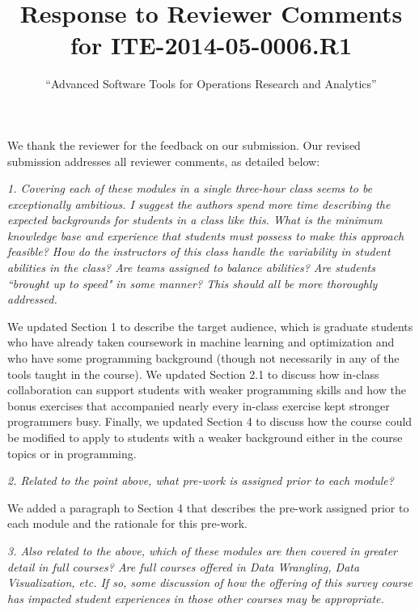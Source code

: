 \documentclass[12pt, letterpaper]{article}
\title{Response to Reviewer Comments for ITE-2014-05-0006.R1}
\author{``Advanced Software Tools for Operations Research and Analytics''}
\date{}
\begin{document}
\maketitle

We thank the reviewer for the feedback on our submission. Our revised submission addresses all reviewer comments, as detailed below:

\vspace{0.5cm}

\noindent\textit{1. Covering each of these modules in a single three-hour class seems to be exceptionally ambitious. I suggest the authors spend more time describing the expected backgrounds for students in a class like this. What is the minimum knowledge base and experience that students must possess to make this approach feasible? How do the instructors of this class handle the variability in student abilities in the class? Are teams assigned to balance abilities? Are students ``brought up to speed" in some manner? This should all be more thoroughly addressed.}

We updated Section 1 to describe the target audience, which is graduate students who have already taken coursework in machine learning and optimization and who have some programming background (though not necessarily in any of the tools taught in the course). We updated Section 2.1 to discuss how in-class collaboration can support students with weaker programming skills and how the bonus exercises that accompanied nearly every in-class exercise kept stronger programmers busy. Finally, we updated Section 4 to discuss how the course could be modified to apply to students with a weaker background either in the course topics or in programming. 

\vspace{0.5cm}

\noindent\textit{2. Related to the point above, what pre-work is assigned prior to each module?}

We added a paragraph to Section 4 that describes the pre-work assigned prior to each module and the rationale for this pre-work.

\vspace{0.5cm}

\noindent\textit{3. Also related to the above, which of these modules are then covered in greater detail in full courses? Are full courses offered in Data Wrangling, Data Visualization, etc. If so, some discussion of how the offering of this survey course has impacted student experiences in those other courses may be appropriate.}
\end{document}
